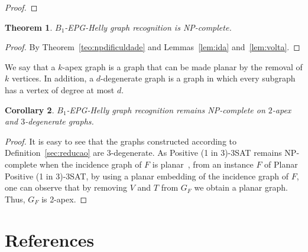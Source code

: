 \documentclass[preprint,12pt]{elsarticle} %
\newtheorem{theorem}{Theorem}
\newtheorem{coro}[theorem]{Corollary}
\begin{document}
\begin{proof}

\end{proof}

\begin{theorem}
{\sc $B_{1}$-EPG-Helly graph recognition} is NP-complete.
\end{theorem}
\begin{proof}
By Theorem~\ref{teo:npdificuldade} and Lemmas~\ref{lem:ida} and~\ref{lem:volta}.
\end{proof}

We say that a $k$-apex graph is a graph that can be made planar by the removal of $k$ vertices. In addition, a $d$-degenerate graph is a graph in which every subgraph has a vertex of degree at most $d$.

\begin{coro}
{\sc $B_{1}$-EPG-Helly graph recognition} remains NP-complete on $2$-apex and $3$-degenerate graphs.
\end{coro}
\begin{proof}

It is easy to see that the graphs constructed according to Definition~\ref{sec:reducao} are $3$-degenerate.
As {\sc Positive (1 in 3)-3SAT} remains NP-complete when the incidence graph of $F$ is planar~\cite{mulzer2008minimum}, from an instance $F$ of {\sc Planar Positive (1 in 3)-3SAT}, by using a planar embedding of the incidence graph of $F$, one can observe that by removing $V$ and $T$ from $G_F$ we obtain a planar graph. Thus, $G_F$ is 2-apex. 
\end{proof}




\section{References}


\end{document}
